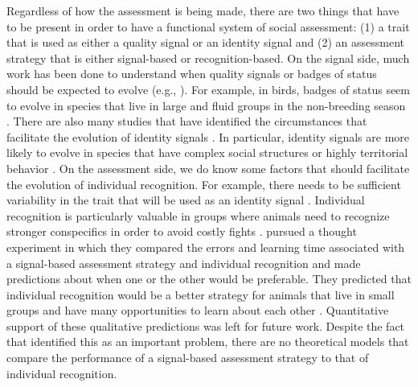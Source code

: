 Regardless of how the assessment is being made, there are two things that have to be present in order to have a functional system of social assessment: (1) a trait that is used as either a quality signal or an identity signal and (2) an assessment strategy that is either signal-based or recognition-based.  On the signal side, much work has been done to understand when quality signals or badges of status should be expected to evolve (e.g., \citep{Whitfield:1987tg,Rohwer:1975fk,Rohwer:1982fk,Dawkins:1991ly,Johnstone:1995vn,Lachmann:1998fk,Tibbetts:2009kx}). For example, in birds, badges of status seem to evolve in species that live in large and fluid groups in the non-breeding season \citep{Tibbetts:2009kx}. There are also many studies that have identified the circumstances that facilitate the evolution of identity signals \citep{Rohwer:1975fk,Whitfield:1987tg,Sheehan:2009we,Pollard:2011te,Sheehan:2014fk}. In particular, identity signals are more likely to evolve in species that have complex social structures or highly territorial behavior \citep{Tibbetts2007IndividualDifferent}. On the assessment side, we do know some factors that should facilitate the evolution of individual recognition. For example, there needs to be sufficient variability in the trait that will be used as an identity signal \citep{Sheehan:2014fk}. Individual recognition is  particularly valuable in groups where animals need to recognize stronger conspecifics in order to avoid costly fights \citep{DEttorre:2005nu}.  \citet{sheehan2016evotradeoff} pursued a thought experiment in which they compared the errors and learning time associated with a signal-based assessment strategy and individual recognition and made predictions about when one or the other would be preferable. They predicted that individual recognition would be a better strategy for animals that live in small groups and have many opportunities to learn about each other \citep{sheehan2016evotradeoff}. Quantitative support of these qualitative predictions was left for future work. Despite the fact that \citet{sheehan2016evotradeoff} identified this as an important problem, there are no theoretical models that compare the performance of a signal-based assessment strategy to that of individual recognition. 

